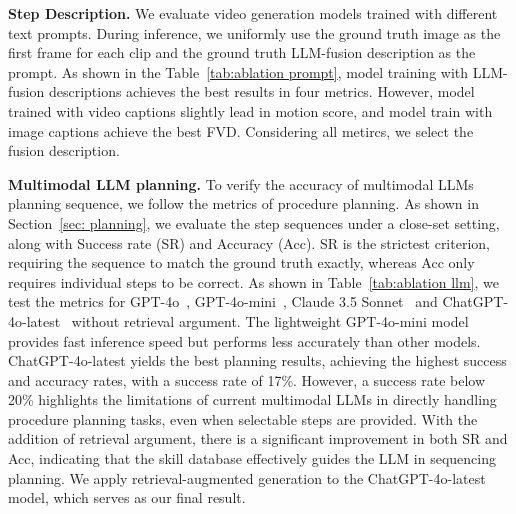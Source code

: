 \textbf{Step Description.} We evaluate video generation models trained with different text prompts. During inference, we uniformly use the ground truth image as the first frame for each clip and the ground truth LLM-fusion description as the prompt. As shown in the Table~\ref{tab:ablation prompt}, model training with LLM-fusion descriptions achieves the best results in four metrics. However, model trained with video captions slightly lead in motion score, and model train with image captions achieve the best FVD. Considering all metircs, we select the fusion description.

\begin{table}[]
\centering
{}
\caption{Ablations on MLLMs planning. We experiment with different MLLMs, where “+RAG” indicates the addition of retrieval-augmented generation. The default choice is colored in \colorbox[rgb]{0.9,0.9,0.9}{gray}.}
\label{tab:ablation llm}
\vspace{-15pt}
\end{table}

\textbf{Multimodal LLM planning.} To verify the accuracy of multimodal LLMs planning sequence, we follow the metrics of procedure planning. As shown in Section~\ref{sec: planning}, we evaluate the step sequences under a close-set setting, along with Success rate (SR) and Accuracy (Acc). SR is the strictest criterion, requiring the sequence to match the ground truth exactly, whereas Acc only requires individual steps to be correct. As shown in Table~\ref{tab:ablation llm}, we test the metrics for GPT-4o~\cite{gpt-4o}, GPT-4o-mini~\cite{gpt-4o-mini}, Claude 3.5 Sonnet~\cite{claude} and ChatGPT-4o-latest~\cite{gpt-4o} without retrieval argument. The lightweight GPT-4o-mini model provides fast inference speed but performs less accurately than other models. ChatGPT-4o-latest yields the best planning results, achieving the highest success and accuracy rates, with a success rate of 17\%. However, a success rate below 20\% highlights the limitations of current multimodal LLMs in directly handling procedure planning tasks, even when selectable steps are provided. With the addition of retrieval argument, there is a significant improvement in both SR and Acc, indicating that the skill database effectively guides the LLM in sequencing planning. We apply retrieval-augmented generation to the ChatGPT-4o-latest model, which serves as our final result.


